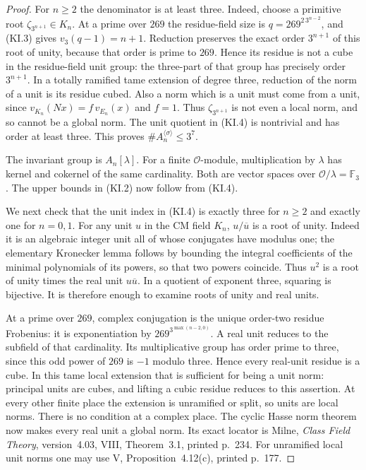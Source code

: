 \begin{proof}
For $n\geq2$ the denominator is at least three.  Indeed, choose
a primitive root $\zeta_{3^{n+1}}\in K_n$.  At a prime over
$269$ the residue-field size is
$q=269^{2\,3^{n-2}}$, and (KI.3) gives
$v_3(q-1)=n+1$.  Reduction preserves the exact order
$3^{n+1}$ of this root of unity, because that order is prime
to $269$.  Hence its residue is not a cube in the residue-field
unit group: the three-part of that group has precisely order
$3^{n+1}$.  In a totally ramified tame extension of degree
three, reduction of the norm of a unit is its residue cubed.
Also a norm which is a unit must come from a unit, since
$v_{K_n}(Nx)=f\,v_{E_n}(x)$ and $f=1$.
Thus $\zeta_{3^{n+1}}$ is not even a local norm, and so cannot
be a global norm.  The unit quotient in (KI.4) is nontrivial
and has order at least three.  This proves
$\#A_n^{\langle\sigma\rangle}\leq3^7$.

The invariant group is $A_n[\lambda]$.  For a finite
$\mathcal O$-module, multiplication by $\lambda$ has kernel
and cokernel of the same cardinality.  Both are vector spaces
over $\mathcal O/\lambda=\mathbb F_3$.
The upper bounds in (KI.2) now follow from (KI.4).

We next check that the unit index in (KI.4) is exactly three
for $n\geq2$ and exactly one for $n=0,1$.
For any unit $u$ in the CM field $K_n$, $u/\overline u$
is a root of unity.  Indeed it is an algebraic integer unit
all of whose conjugates have modulus one; the elementary
Kronecker lemma follows by bounding the integral coefficients
of the minimal polynomials of its powers, so that two powers
coincide.  Thus $u^2$ is a root of unity times the real unit
$u\overline u$.  In a quotient of exponent three, squaring
is bijective.  It is therefore enough to examine roots of
unity and real units.

At a prime over $269$, complex conjugation is the unique
order-two residue Frobenius: it is exponentiation by
$269^{3^{\max(n-2,0)}}$.  A real unit reduces to the
subfield of that cardinality.  Its multiplicative group has
order prime to three, since this odd power of $269$ is
$-1$ modulo three.  Hence every real-unit residue is a cube.
In this tame local extension that is sufficient for being
a unit norm: principal units are cubes, and lifting a
cubic residue reduces to this assertion.  At every other
finite place the extension is unramified or split, so units
are local norms.  There is no condition at a complex place.
The cyclic Hasse norm theorem now makes every real unit
a global norm.  Its exact locator is Milne, \emph{Class Field
Theory}, version~4.03, VIII, Theorem~3.1, printed p.~234.
For unramified local unit norms one may use V,
Proposition~4.12(c), printed p.~177.


\end{proof}
